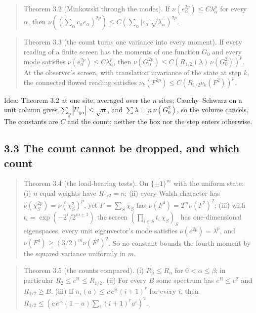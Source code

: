 \documentclass[10pt,letterpaper,twocolumn]{article}
\begin{document}
\begin{quote}
Theorem 3.2 (Minkowski through the modes). If \(\nu(e_\alpha^{2p})\le C\lambda_\alpha^p\) for every \(\alpha\), then \(\nu((\sum_\alpha c_\alpha e_\alpha)^{2p})\le C(\sum_\alpha|c_\alpha|\sqrt{\lambda_\alpha})^{2p}\).
\end{quote}

\begin{quote}
Theorem 3.3 (the count turns one variance into every moment). If every reading of a finite screen has the moments of one function \(G_0\) and every mode satisfies \(\nu(e_\alpha^{2p})\le C\lambda_\alpha^p\), then \(\nu(G_0^{2p})\le C(R_{1/2}(\lambda)\,\nu(G_0^2))^p\). At the observer's screen, with translation invariance of the state at step \(k\), the connected flowed reading satisfies \(\nu_k(F^{2p})\le C(R_{1/2}\nu_k(F^2))^p\).
\end{quote}

Idea: Theorem 3.2 at one site, averaged over the \(n\) sites; Cauchy--Schwarz on a unit column gives \(\sum_y|U_{y\alpha}|\le\sqrt n\), and \(\sum\lambda=n\,\nu(G_0^2)\), so the volume cancels. The constants are \(C\) and the count; neither the box nor the step enters otherwise.

\subsection{3.3 The count cannot be dropped, and which count}\label{33-the-count-cannot-be-dropped-and-which-count}

\begin{quote}
Theorem 3.4 (the load-bearing tests). On \(\{\pm1\}^m\) with the uniform state: (i) \(n\) equal weights have \(R_{1/2}=n\); (ii) every Walsh character has \(\nu(\chi_S^{2p})=\nu(\chi_S^2)^p\), yet \(F=\sum_S\chi_S\) has \(\nu(F^4)=2^m\nu(F^2)^2\); (iii) with \(t_i=\exp(-2^i/2^{m+1})\) the screen \((\prod_{i\in S}t_i\,\chi_S)_S\) has one-dimensional eigenspaces, every unit eigenvector's mode satisfies \(\nu(e^{2p})=\lambda^p\), and \(\nu(F^4)\ge(3/2)^m\nu(F^2)^2\). So no constant bounds the fourth moment by the squared variance uniformly in \(m\).
\end{quote}

\begin{quote}
Theorem 3.5 (the counts compared). (i) \(R_\beta\le R_\alpha\) for \(0<\alpha\le\beta\); in particular \(R_2\le e^{\mathrm H}\le R_{1/2}\). (ii) For every \(B\) some spectrum has \(e^{\mathrm H}\le e^2\) and \(R_{1/2}\ge B\). (iii) If \(n_i(a)\le c\,e^{\mathrm H}(i+1)^r\) for every \(i\), then \(R_{1/2}\le(c\,e^{\mathrm H}(1-a)\sum_i(i+1)^ra^i)^2\).
\end{quote}
\end{document}

